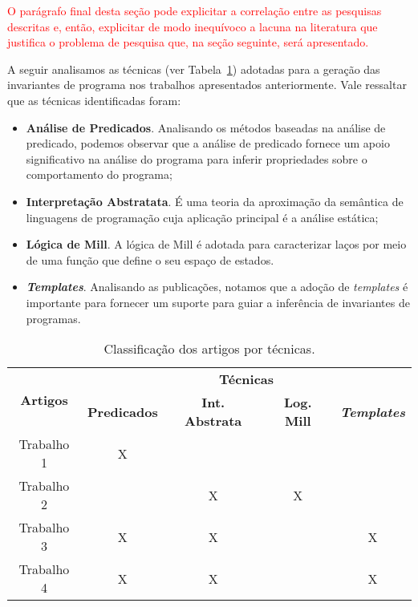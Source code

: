 \textcolor{red}{O parágrafo final desta seção pode explicitar a correlação entre as pesquisas descritas e, então, explicitar de modo inequívoco a lacuna na literatura que justifica o problema de pesquisa que, na seção seguinte, será apresentado.}


A seguir analisamos as técnicas (ver Tabela~\ref{Table:TechByPapers}) 
adotadas para a geração das invariantes de programa nos trabalhos apresentados anteriormente. Vale ressaltar que as técnicas identificadas foram:

\begin{itemize}
    \item \textbf{Análise de Predicados}. Analisando os métodos baseadas na análise de predicado, podemos observar que a análise de predicado fornece um apoio significativo na análise do programa para inferir propriedades sobre o comportamento do programa;
    \item \textbf{Interpretação Abstratata}. É uma teoria da aproximação da semântica de linguagens de programação cuja aplicação principal é a análise estática;
    \item \textbf{Lógica de Mill}. A lógica de Mill é adotada para caracterizar laços por meio de uma função que define o seu espaço de estados.
    \item \textbf{\textit{Templates}}. Analisando as publicações, notamos que a adoção de \textit{templates} é importante para fornecer um suporte para guiar a inferência de invariantes de programas.
\end{itemize}{}

\begin{table}[htbp]  
  \centering  
  \begin{tabular}{|c|c|c|c|c|}
    \hline
    \multicolumn{1}{|c|}{\multirow{2}{*}{\textbf{Artigos}}} & 
    \multicolumn{4}{c|}{\textbf{Técnicas}} \bigstrut\\
    \cline{2-5} &
    \textbf{Predicados} & \textbf{Int. Abstrata} & \textbf{Log. Mill} & \textbf{\textit{Templates}} \bigstrut\\
    \hline
    Trabalho 1 & X &  &  &  \bigstrut\\
    \hline
    Trabalho 2 &  & X & X &  \bigstrut\\
    \hline
    Trabalho 3 & X & X &  & X \bigstrut\\
    \hline
    Trabalho 4 & X & X &  & X \bigstrut\\
    \hline
  \end{tabular}  
  \caption{Classificação dos artigos por técnicas.}
  \label{Table:TechByPapers}
\end{table}%
